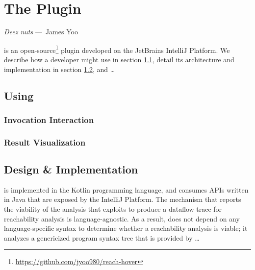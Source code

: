 
\chapter{The \toolname{} Plugin}
\label{ch:Tool}

\begin{epigraph}
  \emph{
    Deez nuts
    } ---~James Yoo
\end{epigraph}

\noindent \toolname{} is an open-source\footnote{\url{https://github.com/jyoo980/reach-hover}}
plugin developed on the JetBrains IntelliJ Platform.
We describe how a developer might use \toolname{} in
section \ref{sec:UsingReachHover}, detail its architecture and implementation 
in section \ref{sec:Architecture}, and \dots

\section{Using \toolname{}}
\label{sec:UsingReachHover}

\subsection{Invocation Interaction}
\label{subsection:InvocationInteraction}


\subsection{Result Visualization}
\label{subsection:ResultVisualization}


\section{Design \& Implementation}
\label{sec:Architecture}

\toolname{} is implemented in the Kotlin programming language, and consumes
\acp{API} written in Java that are exposed by the IntelliJ Platform.
The mechanism that reports the viability of the analysis that \toolname{}
exploits to produce a dataflow trace for reachability analysis is 
language-agnostic.
As a result, \toolname{} does not depend on any language-specific syntax to 
determine whether a reachability analysis is viable; it analyzes a genericized 
program syntax tree that is provided by  \dots

\endinput
